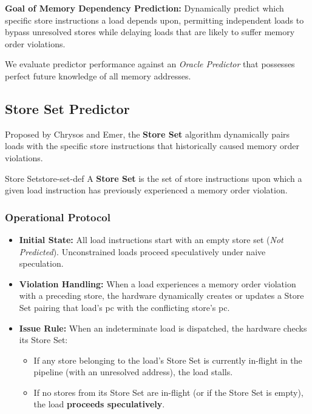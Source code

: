 \textbf{Goal of Memory Dependency Prediction:} Dynamically predict which specific store instructions a load depends upon, permitting independent loads to bypass unresolved stores while delaying loads that are likely to suffer memory order violations.

We evaluate predictor performance against an \textit{Oracle Predictor} that possesses perfect future knowledge of all memory addresses.

\subsection{Store Set Predictor}

Proposed by Chrysos and Emer, the \textbf{Store Set} algorithm dynamically pairs loads with the specific store instructions that historically caused memory order violations.

\begin{definition}{Store Set}{store-set-def}
A \textbf{Store Set} is the set of store instructions upon which a given load instruction has previously experienced a memory order violation.
\end{definition}

\subsubsection{Operational Protocol}
\begin{itemize}
    \item \textbf{Initial State:} All load instructions start with an empty store set (\textit{Not Predicted}). Unconstrained loads proceed speculatively under naive speculation.
    \item \textbf{Violation Handling:} When a load experiences a memory order violation with a preceding store, the hardware dynamically creates or updates a Store Set pairing that load's \gls{pc} with the conflicting store's \gls{pc}.
    \item \textbf{Issue Rule:} When an indeterminate load is dispatched, the hardware checks its Store Set:
    \begin{itemize}
        \item If any store belonging to the load's Store Set is currently in-flight in the pipeline (with an unresolved address), the load stalls.
        \item If no stores from its Store Set are in-flight (or if the Store Set is empty), the load \textbf{proceeds speculatively}.
    \end{itemize}
\end{itemize}

